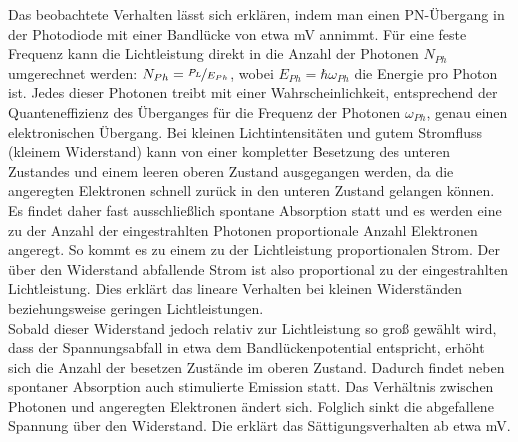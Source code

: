 Das beobachtete Verhalten lässt sich erklären, indem man einen PN-Übergang in der Photodiode mit einer Bandlücke von etwa \unit[400-500]{mV} annimmt. Für eine feste Frequenz kann die Lichtleistung direkt in die Anzahl der Photonen $N_{Ph}$ umgerechnet werden: $N_{Ph} = \nicefrac{P_L}{E_{Ph}}$, wobei $E_{Ph}=\hbar \omega_{Ph}$ die Energie pro Photon ist. Jedes dieser Photonen treibt mit einer Wahrscheinlichkeit, entsprechend der Quanteneffizienz des Überganges für die Frequenz der Photonen $\omega_{Ph}$, genau einen elektronischen Übergang. Bei kleinen Lichtintensitäten und gutem Stromfluss (kleinem Widerstand) kann von einer kompletter Besetzung des unteren Zustandes und einem leeren oberen Zustand ausgegangen werden, da die angeregten Elektronen schnell zurück in den unteren Zustand gelangen können. Es findet daher fast ausschließlich spontane Absorption statt und es werden eine zu der Anzahl der eingestrahlten Photonen proportionale Anzahl Elektronen angeregt. So kommt es zu einem zu der Lichtleistung proportionalen Strom. Der über den Widerstand abfallende Strom ist also proportional zu der eingestrahlten Lichtleistung. Dies erklärt das lineare Verhalten bei kleinen Widerständen beziehungsweise geringen Lichtleistungen.\\
Sobald dieser Widerstand jedoch relativ zur Lichtleistung so groß gewählt wird, dass der Spannungsabfall in etwa dem Bandlückenpotential entspricht, erhöht sich die Anzahl der besetzen Zustände im oberen Zustand. Dadurch findet neben spontaner Absorption auch stimulierte Emission statt. Das Verhältnis zwischen Photonen und angeregten Elektronen ändert sich. Folglich sinkt die abgefallene Spannung über den Widerstand. Die erklärt das Sättigungsverhalten ab etwa \unit[300]{mV}.
